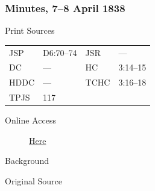		\subsubsection{Minutes, 7--8 April 1838}
			\label{EMS-1838-JS-7-8-APR-1838}
			
			\begin{description}
					\item[Print Sources]
				\end{description}

					\begin{tabular}{p{0.5in}p{1in}p{0.5in}p{1in}}
					JSP	 	& D6:70--74		& JSR 		& --- \\
					DC	 	& ---		& HC 		& 3:14--15 \\
					HDDC 	& ---		& TCHC 		& 3:16--18 \\
					TPJS 	& 117			& 	 		&  \\
					\end{tabular}
				
				\begin{description}
					\item[Online Access] \href{https://www.josephsmithpapers.org/paper-summary/minutes-7-8-april-1838/1}{Here}
				\end{description}
				
				\begin{description}
					\item[Background]
				\end{description}
				
				
				\begin{description}
					\item[Original Source]
				\end{description}
				
				

